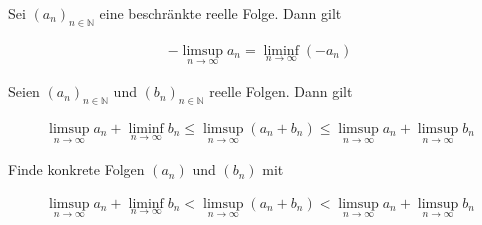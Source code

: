 \documentclass[fontsize=9pt,
               parskip=half-,
               DIV=14,
               listof=chapterentry,
               tocflat]{scrbook}
\begin{document}
\begin{theorem*}
Sei $(a_{n})_{n\in \mathbb {N} }$ eine beschränkte reelle Folge. Dann gilt

\begin{align*}
-\limsup _{n\to \infty }a_{n}=\liminf _{n\to \infty }(-a_{n})
\end{align*}

\end{theorem*}

\begin{theorem*}[Summenregel]
Seien $(a_{n})_{n\in \mathbb {N} }$ und $(b_{n})_{n\in \mathbb {N} }$ reelle Folgen. Dann gilt

\begin{align*}
\limsup _{n\to \infty }a_{n}+\liminf _{n\to \infty }b_{n}\leq \limsup _{n\to \infty }(a_{n}+b_{n})\leq \limsup _{n\to \infty }a_{n}+\limsup _{n\to \infty }b_{n}
\end{align*}

\end{theorem*}

\begin{exercise*}
Finde konkrete Folgen $(a_{n})$ und $(b_{n})$ mit

\begin{align*}
\limsup _{n\to \infty }a_{n}+\liminf _{n\to \infty }b_{n}<\limsup _{n\to \infty }(a_{n}+b_{n})<\limsup _{n\to \infty }a_{n}+\limsup _{n\to \infty }b_{n}
\end{align*}

\end{exercise*}
\end{document}
